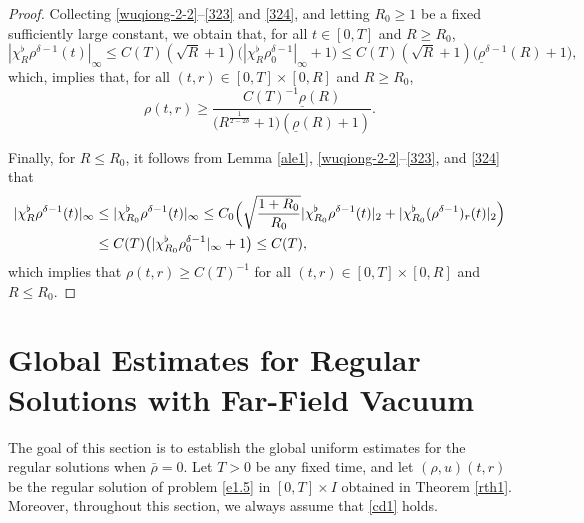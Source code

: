 \documentclass[11pt,reqno]{amsart}
\numberwithin{rk}{section}
\numberwithin{prop}{section}
\numberwithin{mydef}{section}
\numberwithin{lem}{section}
\numberwithin{equation}{section}
\numberwithin{thm}{section}
\begin{document}
\begin{proof}
Collecting \eqref{wuqiong-2-2}--\eqref{323} and \eqref{324}, and letting $R_0\geq 1$ be a fixed sufficiently large constant, we obtain that, for all $t\in [0,T]$ and $R\geq R_0$,
\begin{equation*}
|\chi_R^\flat\rho^{\delta-1}(t)|_\infty\leq C(T)(\sqrt{R}+1) \big(|\chi_R^\flat\rho_0^{\delta-1}|_\infty+1 \big)\leq C(T)(\sqrt{R}+1) \big(\underline{\rho}^{\delta-1}(R)+1 \big), 
\end{equation*}
which, implies that, for all $(t,r)\in[0,T]\times [0,R]$ and $R\geq R_0$, 
\begin{equation*}
 \rho(t,r)\geq \frac{C(T)^{-1}\underline{\rho}(R)}{\big(R^{\frac{1}{2-2\delta}}+1\big)(\underline{\rho}(R)+1)}.  
\end{equation*}

Finally, for $R\leq R_0$, it follows from Lemma \ref{ale1}, \eqref{wuqiong-2-2}--\eqref{323}, and \eqref{324} that 
\begin{equation*}
\begin{aligned}
|\chi_{R}^\flat\rho^{\delta-1}(t)|_\infty&\leq |\chi_{R_0}^\flat\rho^{\delta-1}(t)|_\infty \leq C_0\Big(\sqrt{\frac{1+R_0}{R_0}} |\chi_{R_0}^\flat\rho^{\delta-1}(t)|_2+|\chi_{R_0}^\flat(\rho^{\delta-1})_r(t)|_2\Big)\notag \\
&\leq  C(T) \big(|\chi_{R_0}^\flat\rho_0^{\delta-1}|_\infty+1 \big)\leq C(T),
\end{aligned}
\end{equation*}
which implies that $\rho(t,r)\geq C(T)^{-1}$ for all $(t,r)\in[0,T]\times [0,R]$ and $R\leq R_0$.
\end{proof}
 

\section{Global  Estimates for  
Regular Solutions with Far-Field Vacuum}\label{section-global2}
The goal of this section is to establish the global uniform estimates for the regular solutions when  $\bar\rho=0$. Let $T>0$ be any fixed time, and let $(\rho, u)(t,r)$ be the regular solution of problem \eqref{e1.5} in $[0,T]\times I$ 
obtained in Theorem \ref{rth1}. Moreover, throughout this section, we always assume that 
\eqref{cd1} holds.
\end{document}
